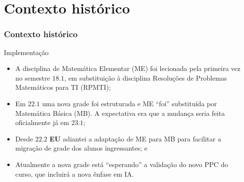 \section{Contexto histórico}


\begin{frame}
    \frametitle{Contexto histórico}
    
    \begin{block}{Implementação}
            \begin{itemize}
            \item A disciplina de Matemática Elementar (ME) foi lecionada pela primeira vez no semestre $18.1$, em substituição à disciplina Resoluções de Problemas Matemáticos para TI (RPMTI); \pause
            \item Em $22.1$ uma nova grade foi estruturada e ME ``foi'' substituída por Matemática Básica (MB). A expectativa era que a mudança seria feita oficialmente já em $23.1$; \pause
            \item Desde $22.2$ \textbf{EU} adiantei a adaptação de ME para MB para facilitar a migração de grade dos alunos ingressantes; \pause e
            \item Atualmente a nova grade está ``esperando'' a validação do novo PPC do curso, que incluirá a nova ênfase em IA.
        \end{itemize} 
       
    \end{block}
\end{frame}
